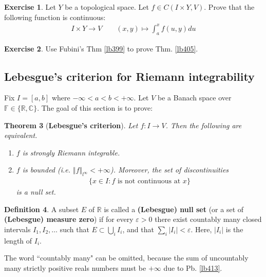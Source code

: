 \documentclass[12pt,b5paper,notitlepage]{article}
\theoremstyle{definition}
\newtheorem{df}{Definition}[section]
\newtheorem{exe}[df]{Exercise}
\theoremstyle{plain}
\newtheorem{thm}[df]{Theorem}
\newcommand{\Cbb}{\mathbb C}
\newcommand{\Rbb}{\mathbb R}
\newcommand{\Fbb}{\mathbb F}
\newcommand{\eps}{\varepsilon}
\numberwithin{equation}{section}
\begin{document}
\begin{exe}\label{lb408}
Let $Y$ be a topological space. Let $f\in C(I\times Y,V)$. Prove that the following function is continuous:
\begin{gather}
I\times Y\rightarrow V\qquad (x,y)\mapsto\int_a^x f(u,y)du
\end{gather}
\end{exe}



\begin{exe}
Use Fubini's Thm \ref{lb399} to prove Thm. \ref{lb405}.
\end{exe}




\subsection{Lebesgue's criterion for Riemann integrability}\label{lb522}


Fix $I=[a,b]$ where $-\infty<a<b<+\infty$. Let $V$ be a Banach space over $\Fbb\in\{\Rbb,\Cbb\}$. The goal of this section is to prove:


\begin{thm}[\textbf{Lebesgue's criterion}]   \label{lb411}
Let $f:I\rightarrow V$. Then the following are equivalent.
\begin{enumerate}[label=(\arabic*)]
\item $f$ is strongly Riemann integrable.
\item $f$ is bounded (i.e. $\Vert f\Vert_{l^\infty}<+\infty$). Moreover, the set of discontinuities
\begin{align}
\{x\in I:f\text{ is not continuous at }x\}
\end{align}
is a null set.
\end{enumerate}
\end{thm}


\begin{df}\label{lb409}
A subset $E$ of $\Rbb$ is called a  \textbf{(Lebesgue) null set}  (or a set of \textbf{(Lebesgue) measure zero}) if for every $\eps>0$ there exist countably many closed intervals $I_1,I_2,\dots$ such that $E\subset\bigcup_i I_i$, and that $\sum_i |I_i|<\eps$. Here, $|I_i|$ is the length of $I_i$.
\end{df}

The word ``countably many" can be omitted, because the sum of uncountably many strictly positive reals numbers must be $+\infty$ due to Pb. \ref{lb413}.
\end{document}
